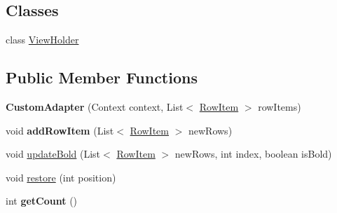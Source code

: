 \subsection*{Classes}
\begin{DoxyCompactItemize}
\item 
class \hyperlink{classcom_1_1example_1_1sebastian_1_1tindertp_1_1chatListTools_1_1CustomAdapter_1_1ViewHolder}{View\+Holder}
\end{DoxyCompactItemize}
\subsection*{Public Member Functions}
\begin{DoxyCompactItemize}
\item 
{\bfseries Custom\+Adapter} (Context context, List$<$ \hyperlink{classcom_1_1example_1_1sebastian_1_1tindertp_1_1chatListTools_1_1RowItem}{Row\+Item} $>$ row\+Items)\hypertarget{classcom_1_1example_1_1sebastian_1_1tindertp_1_1chatListTools_1_1CustomAdapter_aba04e26fba7bea06e3f5c8b0d91c8ec2}{}\label{classcom_1_1example_1_1sebastian_1_1tindertp_1_1chatListTools_1_1CustomAdapter_aba04e26fba7bea06e3f5c8b0d91c8ec2}

\item 
void {\bfseries add\+Row\+Item} (List$<$ \hyperlink{classcom_1_1example_1_1sebastian_1_1tindertp_1_1chatListTools_1_1RowItem}{Row\+Item} $>$ new\+Rows)\hypertarget{classcom_1_1example_1_1sebastian_1_1tindertp_1_1chatListTools_1_1CustomAdapter_a140e6a0fd7147f1d147dd7d1182cc9d0}{}\label{classcom_1_1example_1_1sebastian_1_1tindertp_1_1chatListTools_1_1CustomAdapter_a140e6a0fd7147f1d147dd7d1182cc9d0}

\item 
void \hyperlink{classcom_1_1example_1_1sebastian_1_1tindertp_1_1chatListTools_1_1CustomAdapter_a50145336c0020de96d4fc7135c34e138}{update\+Bold} (List$<$ \hyperlink{classcom_1_1example_1_1sebastian_1_1tindertp_1_1chatListTools_1_1RowItem}{Row\+Item} $>$ new\+Rows, int index, boolean is\+Bold)
\item 
void \hyperlink{classcom_1_1example_1_1sebastian_1_1tindertp_1_1chatListTools_1_1CustomAdapter_ad469da0f929b4bc20d3fb4afb5fc1a59}{restore} (int position)
\item 
int {\bfseries get\+Count} ()\hypertarget{classcom_1_1example_1_1sebastian_1_1tindertp_1_1chatListTools_1_1CustomAdapter_aeb208fb87cab994c0f2def005b9b76f0}{}\label{classcom_1_1example_1_1sebastian_1_1tindertp_1_1chatListTools_1_1CustomAdapter_aeb208fb87cab994c0f2def005b9b76f0}


\end{DoxyCompactItemize}
